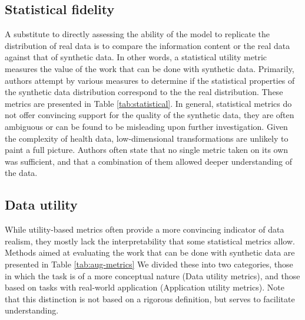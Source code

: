     \subsection{Statistical fidelity}
        A substitute to directly assessing the ability of the model to replicate the distribution of real data is to compare the information content or the real data against that of synthetic data. In other words, a statistical utility metric measures the value of the work that can be done with synthetic data. Primarily, authors attempt by various measures to determine if the statistical properties of the synthetic data distribution correspond to the the real distribution. These metrics are presented in Table \ref{tab:statistical}. In general, statistical metrics do not offer convincing support for the quality of the synthetic data, they are often ambiguous or can be found to be misleading upon further investigation. Given the complexity of health data, low-dimensional transformations are unlikely to paint a full picture. Authors often state that no single metric taken on its own was sufficient, and that a combination of them allowed deeper understanding of the data. 
        
    \subsection{Data utility}
         While utility-based metrics often provide a more convincing indicator of data realism, they mostly lack the interpretability that some statistical metrics allow. Methods aimed at evaluating the work that can be done with synthetic data are presented in Table \ref{tab:aug-metrics} We divided these into two categories, those in which the task is of a more conceptual nature (Data utility metrics), and those based on tasks with real-world application (Application utility metrics). Note that this distinction is not based on a rigorous definition, but serves to facilitate understanding.


